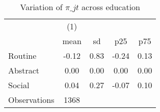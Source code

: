 \begin{table}[htbp]\centering
\def\sym#1{\ifmmode^{#1}\else\(^{#1}\)\fi}
\caption{Variation of $\pi\_{jt}$ across education}
\begin{tabular}{l*{1}{cccc}}
\toprule
                    &\multicolumn{1}{c}{(1)}&            &            &            \\
                    &        mean&          sd&         p25&         p75\\
\midrule
Routine             &       -0.12&        0.83&       -0.24&        0.13\\
Abstract            &        0.00&        0.00&        0.00&        0.00\\
Social              &        0.04&        0.27&       -0.07&        0.10\\
\midrule
Observations        &        1368&            &            &            \\
\bottomrule
\end{tabular}
\end{table}
